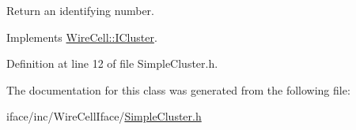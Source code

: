 Return an identifying number. 



Implements \hyperlink{class_wire_cell_1_1_i_cluster_a64b77adf75c8a213a355bece6679f1d5}{Wire\+Cell\+::\+I\+Cluster}.



Definition at line 12 of file Simple\+Cluster.\+h.



The documentation for this class was generated from the following file\+:\begin{DoxyCompactItemize}
\item 
iface/inc/\+Wire\+Cell\+Iface/\hyperlink{_simple_cluster_8h}{Simple\+Cluster.\+h}\end{DoxyCompactItemize}
